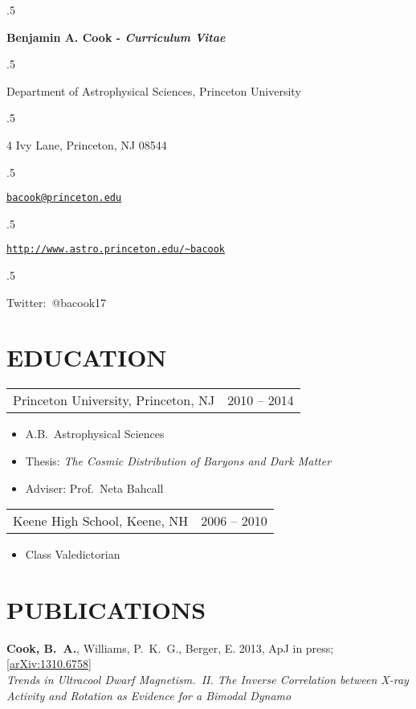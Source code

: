 \documentclass[margin]{res}
\newcommand\mancenter[1]{\moveleft.5\hoffset\centerline{#1}}
\begin{document}
  
\mancenter{\huge \bf{Benjamin A. Cook} -
  \textit{Curriculum Vitae}} \mancenter{\large Department of
  Astrophysical Sciences, Princeton University} \mancenter{\large 4
  Ivy Lane, Princeton, NJ 08544}
\mancenter{\large\tt\href{mailto:bacook@princeton.edu}{bacook@princeton.edu}}
\mancenter{\large\tt\url{http://www.astro.princeton.edu/~bacook}}
\mancenter{\large Twitter:~@bacook17}
\begin{resume}                        
 
 
\section{EDUCATION}       
				\begin{tabular}{@{}p{4in} r@{}}
				Princeton University, Princeton, NJ &
                                2010 -- 2014
				\end{tabular}
				\begin{itemize} \itemsep -2pt
                \item[] A.B.~Astrophysical Sciences
                \item[] Thesis: \textit{The Cosmic Distribution of Baryons and Dark Matter}
                \item[] Adviser: Prof.~Neta Bahcall
                \end{itemize}
 
                                \begin{tabular}{@{}p{4in} r@{}}
                                  Keene High School, Keene, NH & 2006 -- 2010
                                  \end{tabular}
                                \begin{itemize} \itemsep -2pt
                                  \item[] Class Valedictorian
                                    \end{itemize}

\section{PUBLICATIONS}

\textbf{Cook, B.~A.}, Williams, P.~K.~G., Berger, E. 2013,
ApJ in press; [\href{http://arxiv.org/abs/1310.6758}{arXiv:1310.6758}]\\ \textit{Trends in Ultracool
  Dwarf Magnetism.~II. The Inverse Correlation between X-ray Activity
  and Rotation as Evidence for a Bimodal Dynamo}


\end{resume}
\end{document}
